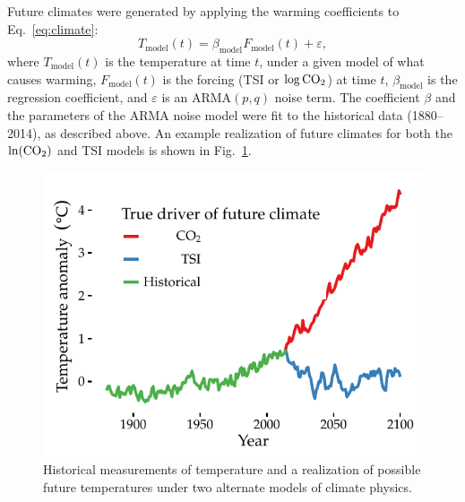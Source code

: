 \documentclass{wscpaperproc}\usepackage[]{graphicx}\usepackage[]{color}
\makeatletter
\def\maxwidth{ %
  \ifdim\Gin@nat@width>\linewidth
    \linewidth
  \else
    \Gin@nat@width
  \fi
}
\newenvironment{knitrout}{}{} %
\newcommand{\ARMA}{\text{ARMA}}
\makeatother
\begin{document}
Future climates were generated by applying the warming coefficients to Eq.~\ref{eq:climate}:
\begin{equation}
T_{\text{model}}(t) = \beta_{\text{model}} F_{\text{model}}(t) + \varepsilon,
\label{eq:climate}
\end{equation}
where $T_{\text{model}}(t)$ is the temperature at time $t$, under a given model of what causes warming,
$F_{\text{model}}(t)$ is the forcing (TSI or $\log\ce{CO2}$) at time $t$,
$\beta_{\text{model}}$ is the regression coefficient, and
$\varepsilon$ is an $\ARMA(p,q)$ noise term.
The coefficient $\beta$ and the parameters of the ARMA noise model were fit to the historical data (1880--2014), as described above. 
An example realization of future climates for both the $\ln(\ce{CO2})$ and TSI models is shown in Fig.~\ref{fig:climateplot}.

\begin{knitrout}
\color{fgcolor}\begin{figure}

{\centering \includegraphics[width=\maxwidth]{figure/climateplot-1} 

}

\caption[Historical measurements of temperature and a realization of possible future temperatures under two alternate models of climate physics]{Historical measurements of temperature and a realization of possible future temperatures under two alternate models of climate physics.}\label{fig:climateplot}
\end{figure}


\end{knitrout}
\end{document}
